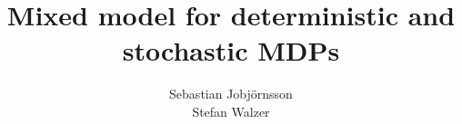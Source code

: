 \documentclass{scrartcl}
\begin{document}
    \author{Sebastian Jobjörnsson\\Stefan Walzer}
    \title{Mixed model for deterministic and stochastic MDPs}
    \maketitle
    
    
    
\end{document}
